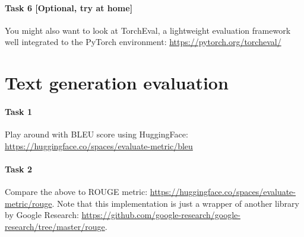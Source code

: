 \documentclass[11pt,a4wide,oneside]{article}
\begin{document}
\paragraph{Task 6 [Optional, try at home]} You might also want to look at Torch\-Eval, a lightweight evaluation framework well integrated to the PyTorch environment: \url{https://pytorch.org/torcheval/}

\section{Text generation evaluation}

\paragraph{Task 1} Play around with BLEU score using HuggingFace: \url{https://huggingface.co/spaces/evaluate-metric/bleu}

\paragraph{Task 2} Compare the above to ROUGE metric:
\url{https://huggingface.co/spaces/evaluate-metric/rouge}. Note that this implementation is just a wrapper of another library by Google Research: \url{https://github.com/google-research/google-research/tree/master/rouge}.
\end{document}
